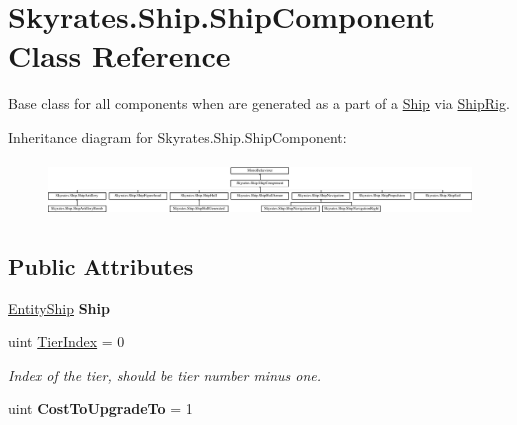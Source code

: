 \hypertarget{class_skyrates_1_1_ship_1_1_ship_component}{\section{Skyrates.\-Ship.\-Ship\-Component Class Reference}
\label{class_skyrates_1_1_ship_1_1_ship_component}
}


Base class for all components when are generated as a part of a \hyperlink{namespace_skyrates_1_1_ship}{Ship} via \hyperlink{class_skyrates_1_1_ship_1_1_ship_rig}{Ship\-Rig}.  


Inheritance diagram for Skyrates.\-Ship.\-Ship\-Component\-:\begin{figure}[H]
\begin{center}
\leavevmode
\includegraphics[height=1.488372cm]{class_skyrates_1_1_ship_1_1_ship_component}
\end{center}
\end{figure}
\subsection*{Public Attributes}
\begin{DoxyCompactItemize}
\item 
\hypertarget{class_skyrates_1_1_ship_1_1_ship_component_a168ce6990e54d3b382ab325b3070e020}{\hyperlink{class_skyrates_1_1_entity_1_1_entity_ship}{Entity\-Ship} {\bfseries Ship}}\label{class_skyrates_1_1_ship_1_1_ship_component_a168ce6990e54d3b382ab325b3070e020}

\item 
uint \hyperlink{class_skyrates_1_1_ship_1_1_ship_component_acb8438da55bb68dfc713c4f340627097}{Tier\-Index} = 0
\begin{DoxyCompactList}\small\item\em Index of the tier, should be tier number minus one. \end{DoxyCompactList}\item 
\hypertarget{class_skyrates_1_1_ship_1_1_ship_component_a8743bea0cb1ce5afe24eed6aa13b1144}{uint {\bfseries Cost\-To\-Upgrade\-To} = 1}\label{class_skyrates_1_1_ship_1_1_ship_component_a8743bea0cb1ce5afe24eed6aa13b1144}

\end{DoxyCompactItemize}



